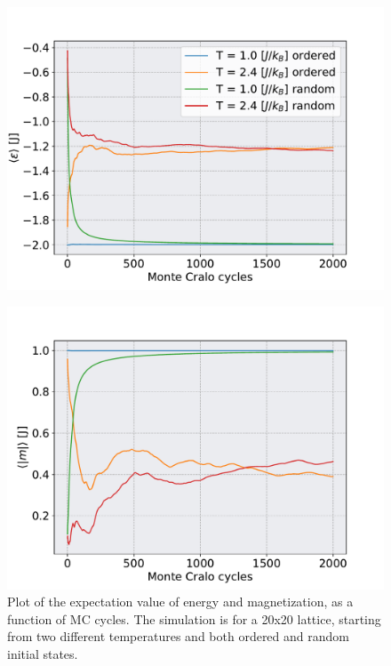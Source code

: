\documentclass[english,notitlepage,reprint,nofootinbib]{revtex4-1}  %
\begin{document}
\begin{figure}[h!]
    \centering %
    \includegraphics[scale=0.4]{figures/5e.pdf} %
    \label{fig:5}
\end{figure}


\begin{figure}[h!]
    \centering %
    \includegraphics[scale=0.4]{figures/5m.pdf} %
    \caption{Plot of the expectation value of energy and magnetization, as a function of MC cycles. The simulation is for a 20x20 lattice, starting from two different temperatures and both ordered and random initial states.}
    \label{fig:5m}
\end{figure}
\end{document}
